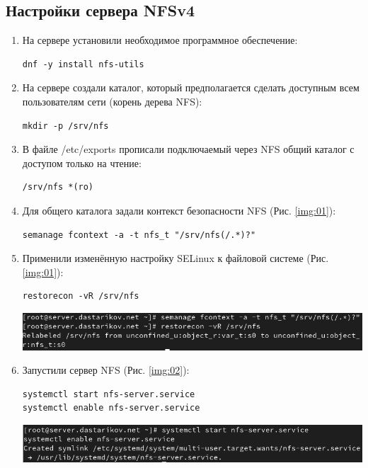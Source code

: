 \subsection{Настройки сервера NFSv4}
\begin{enumerate}
\item На сервере установили необходимое программное обеспечение:
    \begin{verbatim}
dnf -y install nfs-utils
    \end{verbatim}
\item На сервере создали каталог, который предполагается сделать доступным всем
пользователям сети (корень дерева NFS):
    \begin{verbatim}
mkdir -p /srv/nfs
    \end{verbatim}
\item В файле /etc/exports прописали подключаемый через NFS общий каталог с доступом только на чтение:
    \begin{verbatim}
/srv/nfs *(ro)
    \end{verbatim}
\item Для общего каталога задали контекст безопасности NFS (Рис. \ref{img:01}):
    \begin{verbatim}
semanage fcontext -a -t nfs_t "/srv/nfs(/.*)?"
    \end{verbatim}
\item Применили изменённую настройку SELinux к файловой системе (Рис. \ref{img:01}):
    \begin{verbatim}
restorecon -vR /srv/nfs
    \end{verbatim}

\begin{center}
    \centering
    \includegraphics[width=\textwidth]{../images/image01.png}
    \label{img:01}
\end{center}

\item Запустили сервер NFS (Рис. \ref{img:02}):
    \begin{verbatim}
systemctl start nfs-server.service
systemctl enable nfs-server.service
    \end{verbatim}

\begin{center}
    \centering
    \includegraphics[width=\textwidth]{../images/image02.png}
    \label{img:02}
\end{center}


\end{enumerate}
